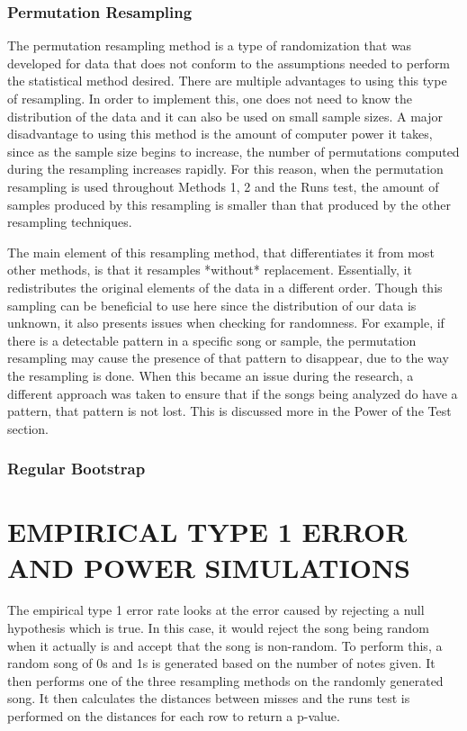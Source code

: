 \documentclass[12pt, letterpaper]{article}
\begin{document}
\subsubsection{Permutation Resampling}
The permutation resampling method is a type of randomization that was developed for data that does not conform to the assumptions needed to perform the statistical method desired. There are multiple advantages to using this type of resampling. In order to implement this, one does not need to know the distribution of the data and it can also be used on small sample sizes. A major disadvantage to using this method is the amount of computer power it takes, since as the sample size begins to increase, the number of permutations computed during the resampling increases rapidly. For this reason, when the permutation resampling is used throughout Methods 1, 2 and the Runs test, the amount of samples produced by this resampling is smaller than that produced by the other resampling techniques.

The main element of this resampling method, that differentiates it from most other methods, is that it resamples *without* replacement. Essentially, it redistributes the original elements of the data in a different order. Though this sampling can be beneficial to use here since the distribution of our data is unknown, it also presents issues when checking for randomness. For example, if there is a detectable pattern in a specific song or sample, the permutation resampling may cause the presence of that pattern to disappear, due to the way the resampling is done. When this became an issue during the research, a different approach was taken to ensure that if the songs being analyzed do have a pattern, that pattern is not lost. This is discussed more in the Power of the Test section. 

\subsubsection{Regular Bootstrap}


\section{EMPIRICAL TYPE 1 ERROR AND POWER SIMULATIONS}
The empirical type 1 error rate looks at the error caused by rejecting a null hypothesis which is true.  In this case, it would reject the song being random when it actually is and accept that the song is non-random.  To perform this, a random song of 0s and 1s is generated based on the number of notes given.  It then performs one of the three resampling methods on the randomly generated song.  It then calculates the distances between misses and the runs test is performed on the distances for each row to return a p-value.
\end{document}

